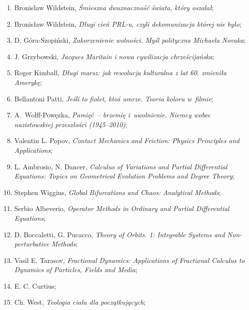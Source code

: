 \documentclass[a4paper,11pt]{article}
\begin{document}
\begin{enumerate}
\item Bronisław Wildstein, \textit{Śmieszna dwuznaczność świata, który
    oszalał};

\item Bronisław Wildstein, \textit{Długi cień PRL-u, czyli dekomunizacja
    której nie było};

\item D. Góra-Szopiński, \textit{Zakorzenienie wolności. Myśl polityczna
    Michaela Novaka};

\item J. Grzybowski, \textit{Jacques Maritain i nowa cywilizacja
    chrześcijańska};

\item Roger Kimball, \textit{Długi marsz: jak rewolucja kulturalna z lat
    60. zmieniła Amerykę};

\item Bellantoni Patti, \textit{Jeśli to fiolet, ktoś umrze. Teoria
    koloru w~filmie};

\item A.~Wolff-Powęzka, \textit{Pamięć~-- brzemię i~uwolnienie. Niemcy
    wobec nazistowskiej przeszłości (1945--2010)};

\item Valentin L. Popov, \textit{Contact Mechanics and Friction: Physics
    Principles and Applications};

\item L. Ambrosio, N. Dancer, \textit{Calculus of Variations and Partial
    Differential Equations: Topics on Geometrical Evolution Problems
    and Degree Theory};

\item Stephen Wiggins, \textit{Global Bifurcations and Chaos: Analytical
    Methods};

\item Serbio Albeverio, \textit{Operator Methods in Ordinary and Partial
    Differential Equations};

\item D. Boccaletti, G. Pucacco, \textit{Theory of Orbits. 1: Integrable
    Systems and Non-perturbative Methods};

\item Vasil E. Tarasov, \textit{Fractional Dynamics: Applications of
    Fractional Calculus to Dynamics of Particles, Fields and Media};

\item E. C. Curtius;

\item Ch. West, \textit{Teologia ciała dla początkujących};


\end{enumerate}
\end{document}
